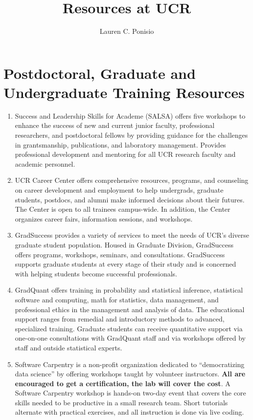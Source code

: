 \documentclass[12pt]{article}
\title{Resources at UCR}
\author{Lauren C. Ponisio}
\begin{document}
\maketitle

\section{Postdoctoral, Graduate and Undergraduate  Training Resources}

\begin{enumerate}
\item Success and Leadership Skills for Academe (SALSA) offers five
  workshops to enhance the success of new and current junior faculty,
  professional researchers, and postdoctoral fellows by providing
  guidance for the challenges in grantsmanship, publications, and
  laboratory management.  Provides professional development and
  mentoring for all UCR research faculty and academic personnel.

\item UCR Career Center offers comprehensive resources, programs, and
  counseling on career development and employment to help undergrads,
  graduate students, postdocs, and alumni make informed decisions
  about their futures. The Center is open to all trainees
  campus-wide. In addition, the Center organizes career fairs,
  information sessions, and workshops.  

\item GradSuccess provides a variety
  of services to meet the needs of UCR’s diverse graduate student
  population. Housed in Graduate Division, GradSuccess offers
  programs, workshops, seminars, and consultations. GradSuccess
  supports graduate students at every stage of their study and is
  concerned with helping students become successful professionals.

\item GradQuant offers training in probability and statistical
  inference, statistical software and computing, math for statistics,
  data management, and professional ethics in the management and
  analysis of data. The educational support ranges from remedial and
  introductory methods to advanced, specialized training. Graduate
  students can receive quantitative support via one-on-one
  consultations with GradQuant staff and via workshops offered by
  staff and outside statistical experts.

\item Software Carpentry is a non-profit organization dedicated to
  “democratizing data science” by offering workshops taught by
  volunteer instructors. \textbf{All are encouraged to get a
    certification, the lab will cover the cost}. A Software Carpentry
  workshop is hands-on two-day event that covers the core skills
  needed to be productive in a small research team. Short tutorials
  alternate with practical exercises, and all instruction is done via
  live coding.


\end{enumerate}
\end{document}
